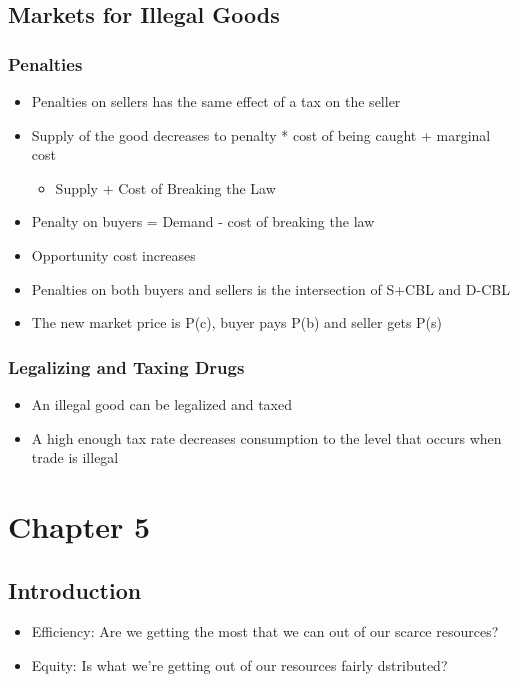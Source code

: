 \documentclass[11pt]{article}
\begin{document}
\subsection{Markets for Illegal Goods}
\label{sec:org70644b3}
\subsubsection{Penalties}
\label{sec:org1046f38}
\begin{itemize}
\item Penalties on sellers has the same effect of a tax on the seller
\item Supply of the good decreases to penalty * cost of being caught + marginal cost 
\begin{itemize}
\item Supply + Cost of Breaking the Law
\end{itemize}
\item Penalty on buyers = Demand - cost of breaking the law
\item Opportunity cost increases
\item Penalties on both buyers and sellers is the intersection of S+CBL and D-CBL
\item The new market price is P(c), buyer pays P(b) and seller gets P(s)
\end{itemize}
\subsubsection{Legalizing and Taxing Drugs}
\label{sec:org5ddf0e1}
\begin{itemize}
\item An illegal good can be legalized and taxed
\item A high enough tax rate decreases consumption to the level that occurs when trade is illegal
\end{itemize}
\section{Chapter 5}
\label{sec:org92a2b00}
\subsection{Introduction}
\label{sec:orgde824cd}
\begin{itemize}
\item Efficiency: Are we getting the most that we can out of our scarce resources?
\item Equity: Is what we're getting out of our resources fairly dstributed?
\end{itemize}
\end{document}
